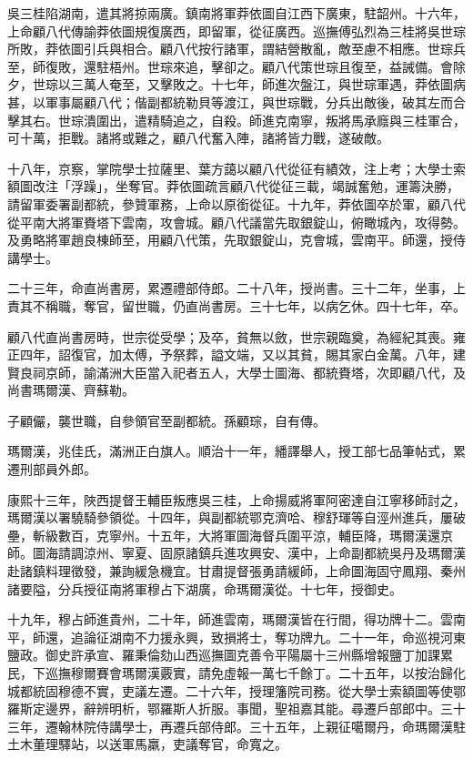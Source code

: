 \begin{pinyinscope}
吳三桂陷湖南，遣其將掠兩廣。鎮南將軍莽依圖自江西下廣東，駐韶州。十六年，上命顧八代傳諭莽依圖規復廣西，即留軍，從征廣西。巡撫傅弘烈為三桂將吳世琮所敗，莽依圖引兵與相合。顧八代按行諸軍，謂結營散亂，敵至慮不相應。世琮兵至，師復敗，還駐梧州。世琮來追，擊卻之。顧八代策世琮且復至，益誡備。會除夕，世琮以三萬人奄至，又擊敗之。十七年，師進次盤江，與世琮軍遇，莽依圖病甚，以軍事屬顧八代；偕副都統勒貝等渡江，與世琮戰，分兵出敵後，破其左而合擊其右。世琮潰圍出，遣精騎追之，自殺。師進克南寧，叛將馬承廕與三桂軍合，可十萬，拒戰。諸將或難之，顧八代奮入陣，諸將皆力戰，遂破敵。

十八年，京察，掌院學士拉薩里、葉方藹以顧八代從征有績效，注上考；大學士索額圖改注「浮躁」，坐奪官。莽依圖疏言顧八代從征三載，竭誠奮勉，運籌決勝，請留軍委署副都統，參贊軍務，上命以原銜從征。十九年，莽依圖卒於軍，顧八代從平南大將軍賚塔下雲南，攻會城。顧八代議當先取銀錠山，俯瞰城內，攻得勢。及勇略將軍趙良棟師至，用顧八代策，先取銀錠山，克會城，雲南平。師還，授侍講學士。

二十三年，命直尚書房，累遷禮部侍郎。二十八年，授尚書。三十二年，坐事，上責其不稱職，奪官，留世職，仍直尚書房。三十七年，以病乞休。四十七年，卒。

顧八代直尚書房時，世宗從受學；及卒，貧無以斂，世宗親臨奠，為經紀其喪。雍正四年，詔復官，加太傅，予祭葬，謚文端，又以其貧，賜其家白金萬。八年，建賢良祠京師，諭滿洲大臣當入祀者五人，大學士圖海、都統賚塔，次即顧八代，及尚書瑪爾漢、齊蘇勒。

子顧儼，襲世職，自參領官至副都統。孫顧琮，自有傳。

瑪爾漢，兆佳氏，滿洲正白旗人。順治十一年，繙譯舉人，授工部七品筆帖式，累遷刑部員外郎。

康熙十三年，陜西提督王輔臣叛應吳三桂，上命揚威將軍阿密達自江寧移師討之，瑪爾漢以署驍騎參領從。十四年，與副都統鄂克濟哈、穆舒琿等自涇州進兵，屢破壘，斬級數百，克寧州。十五年，大將軍圖海督兵圍平涼，輔臣降，瑪爾漢還京師。圖海請調涼州、寧夏、固原諸鎮兵進攻興安、漢中，上命副都統吳丹及瑪爾漢赴諸鎮料理徵發，兼詢緩急機宜。甘肅提督張勇請緩師，上命圖海固守鳳翔、秦州諸要隘，分兵授征南將軍穆占下湖廣，命瑪爾漢從。十七年，授御史。

十九年，穆占師進貴州，二十年，師進雲南，瑪爾漢皆在行間，得功牌十二。雲南平，師還，追論征湖南不力援永興，致損將士，奪功牌九。二十一年，命巡視河東鹽政。御史許承宣、羅秉倫劾山西巡撫圖克善令平陽屬十三州縣增報鹽丁加課累民，下巡撫穆爾賽會瑪爾漢覈實，請免虛報一萬七千餘丁。二十五年，以按治歸化城都統固穆德不實，吏議左遷。二十六年，授理籓院司務。從大學士索額圖等使鄂羅斯定邊界，辭辨明析，鄂羅斯人折服。事聞，聖祖嘉其能。尋遷戶部郎中。三十三年，遷翰林院侍講學士，再遷兵部侍郎。三十五年，上親征噶爾丹，命瑪爾漢駐土木董理驛站，以送軍馬羸，吏議奪官，命寬之。


\end{pinyinscope}
